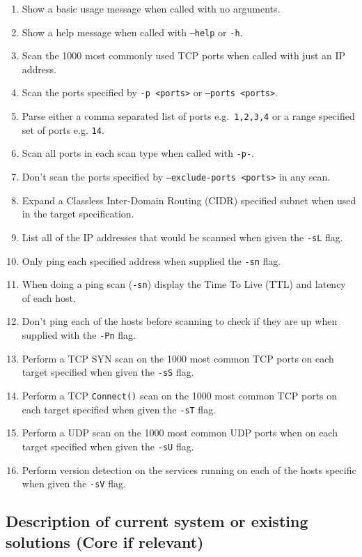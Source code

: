 \documentclass[titlepage]{article}
\begin{document}
\begin{enumerate}
\item{Show a basic usage message when called with no arguments.}
\item{Show a help message when called with \texttt{--help} or \texttt{-h}.}
\item{Scan the 1000 most commonly used TCP ports when called with just an IP address.}
\item{Scan the ports specified by \texttt{-p <ports>} or \texttt{--ports <ports>}.}
\item{Parse either a comma separated list of ports e.g.\ \texttt{1,2,3,4} or a range specified set of ports e.g.
  \texttt{1{\textendash}4}}.
\item{Scan all ports in each scan type when called with \texttt{-p-}.}
\item{Don't scan the ports specified by \texttt{--exclude-ports <ports>} in any scan.}
\item{Expand a Classless Inter-Domain Routing (CIDR) specified subnet when used in the target specification.}
\item{List all of the IP addresses that would be scanned when given the \texttt{-sL} flag.}
\item{Only ping each specified address when supplied the \texttt{-sn} flag.}
\item{When doing a ping scan (\texttt{-sn}) display the Time To Live (TTL) and latency of each host.}
\item{Don't ping each of the hosts before scanning to check if they are up when supplied with the \texttt{-Pn} flag.}
\item{Perform a TCP SYN scan on the 1000 most common TCP ports on each target specified when given the \texttt{-sS} flag.}
\item{Perform a TCP \verb|Connect()| scan on the 1000 most common TCP ports on each target specified when given the \texttt{-sT} flag.}
\item{Perform a UDP scan on the 1000 most common UDP ports when on each target specified when given the \texttt{-sU} flag.}
\item{Perform version detection on the services running on each of the hosts specific when given the \texttt{-sV} flag.}
\end{enumerate}

\subsection{Description of current system or existing solutions (Core if relevant)}
\end{document}
